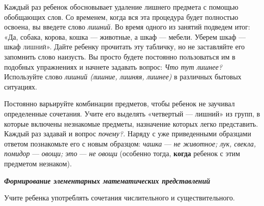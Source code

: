 \documentclass{book}
\renewcommand{\emph}[1]{\textit{#1}}
\begin{document}
Каждый раз ребенок обосновывает удаление лишнего предмета с помощью
обобщающих слов. Со временем, когда вся эта процедура будет полностью
освоена, вы введете слово \emph{лишний.} Во время одного из занятий
подведем итог: «Да, собака, корова, кошка --- животные, а шкаф ---
мебели. Уберем шкаф --- шкаф \textsc{лишний».} Дайте ребенку прочитать
эту табличку, но не заставляйте его запомнить слово наизусть. Вы просто
будете постоянно пользоваться им в подобных упражнениях и начнете
задавать вопрос: \emph{Что тут лишнее?} Используйте слово \emph{лишний
(лишние, лишняя, лишнее)} в различных бытовых ситуациях.

Постоянно варьируйте комбинации предметов, чтобы ребенок не заучивал
определенные сочетания. Учите его выделять «четвертый --- лишний» из
групп, в которые включены незнакомые предметы, назначение которых легко
представить. Каждый раз задавай и вопрос \emph{почему?.} Наряду с уже
приведенными образцами ответом познакомьте его с новым образцом:
\emph{чашка} --- \emph{не животное; лук, свекла, помидор} ---
\emph{овощи; это} --- \emph{не овощи} (особенно тогда, \textbf{когда}
ребенок с этим предметом незнаком).

\emph{\textbf{Формирование элементарных математических представлений}}

Учите ребенка употреблять сочетания числительного и существительного.
\end{document}
